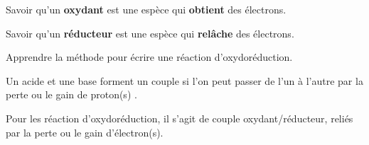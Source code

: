 \tetePremStssRedo

\vspace*{-36pt}


\begin{objectifs}
  \item Savoir qu'un \textbf{oxydant} est une espèce qui \textbf{obtient} des électrons.
  \item Savoir qu'un \textbf{réducteur} est une espèce qui \textbf{relâche} des électrons.
  \item Apprendre la méthode pour écrire une réaction d'oxydoréduction.
\end{objectifs}

\begin{contexte}
  Un acide et une base forment un couple si l'on peut passer de l'un à l'autre par la perte ou le gain de proton(s) .

  Pour les réaction d'oxydoréduction, il s'agit de couple oxydant/réducteur, reliés par la perte ou le gain d'électron(s).
  
\end{contexte}


